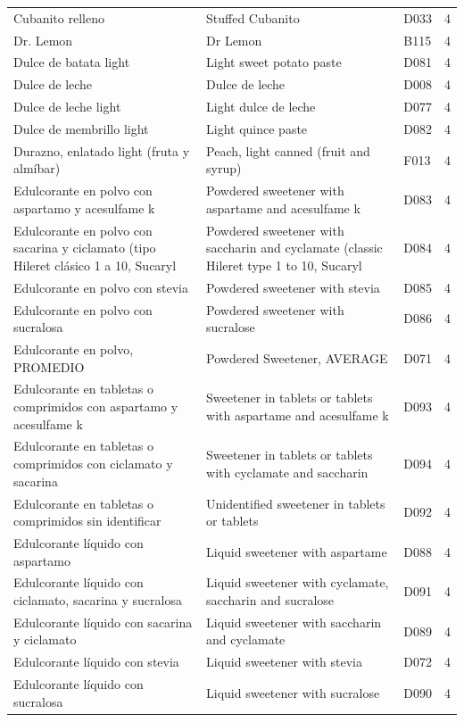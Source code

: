 {\begin{longtable}{p{4.3cm}p{5.5cm}p{1.5cm}p{0.7cm}}
Cubanito relleno & Stuffed Cubanito & D033 & 4\\
Dr. Lemon & Dr Lemon & B115 & 4\\
Dulce de batata light & Light sweet potato paste & D081 & 4\\
Dulce de leche & Dulce de leche & D008 & 4\\
Dulce de leche light & Light dulce de leche & D077 & 4\\
Dulce de membrillo light & Light quince paste & D082 & 4\\
Durazno, enlatado light (fruta y almíbar) & Peach, light canned (fruit and syrup) & F013 & 4\\
Edulcorante en polvo con aspartamo y acesulfame k & Powdered sweetener with aspartame and acesulfame k & D083 & 4\\
Edulcorante en polvo con sacarina y ciclamato (tipo Hileret clásico 1 a 10, Sucaryl & Powdered sweetener with saccharin and cyclamate (classic Hileret type 1 to 10, Sucaryl & D084 & 4\\
Edulcorante en polvo con stevia & Powdered sweetener with stevia & D085 & 4\\
Edulcorante en polvo con sucralosa & Powdered sweetener with sucralose & D086 & 4\\
Edulcorante en polvo, PROMEDIO & Powdered Sweetener, AVERAGE & D071 & 4\\
Edulcorante en tabletas o comprimidos con aspartamo y acesulfame k & Sweetener in tablets or tablets with aspartame and acesulfame k & D093 & 4\\
Edulcorante en tabletas o comprimidos con ciclamato y sacarina & Sweetener in tablets or tablets with cyclamate and saccharin & D094 & 4\\
Edulcorante en tabletas o comprimidos sin identificar & Unidentified sweetener in tablets or tablets & D092 & 4\\
Edulcorante líquido con aspartamo & Liquid sweetener with aspartame & D088 & 4\\
Edulcorante líquido con ciclamato, sacarina y sucralosa & Liquid sweetener with cyclamate, saccharin and sucralose & D091 & 4\\
Edulcorante líquido con sacarina y ciclamato & Liquid sweetener with saccharin and cyclamate & D089 & 4\\
Edulcorante líquido con stevia & Liquid sweetener with stevia & D072 & 4\\
Edulcorante líquido con sucralosa & Liquid sweetener with sucralose & D090 & 4\\

\end{longtable}}
